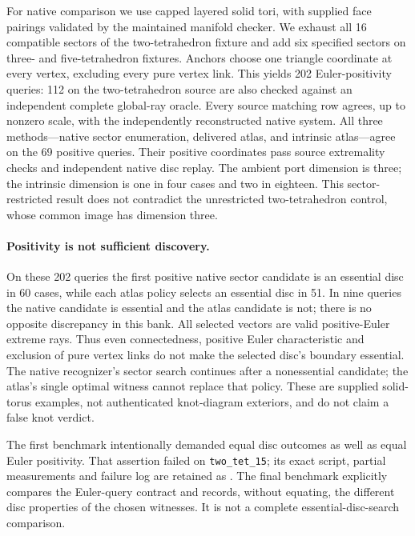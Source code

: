 For native comparison we use capped layered solid tori, with supplied
face pairings validated by the maintained manifold checker.  We exhaust
all 16 compatible sectors of the two-tetrahedron fixture and add six
specified sectors on three- and five-tetrahedron fixtures.  Anchors
choose one triangle coordinate at every vertex, excluding every pure
vertex link.  This yields 202 Euler-positivity queries: 112 on the
two-tetrahedron source are also checked against an independent complete
global-ray oracle.  Every source matching row agrees, up to nonzero
scale, with the independently reconstructed native system.  All three
methods---native sector enumeration, delivered atlas, and intrinsic
atlas---agree on the 69 positive queries.  Their positive coordinates
pass source extremality checks and independent native disc replay.
The ambient port dimension is three; the intrinsic dimension is one
in four cases and two in eighteen.  This sector-restricted result does
not contradict the unrestricted two-tetrahedron control, whose common
image has dimension three.

\paragraph{Positivity is not sufficient discovery.}
On these 202 queries the first positive native sector candidate is an
essential disc in 60 cases, while each atlas policy selects an essential
disc in 51.  In nine queries the native candidate is essential and the
atlas candidate is not; there is no opposite discrepancy in this bank.
All selected vectors are valid positive-Euler extreme rays.  Thus even
connectedness, positive Euler characteristic and exclusion of pure
vertex links do not make the selected disc's boundary essential.
The native recognizer's sector search continues after a nonessential
candidate; the atlas's single optimal witness cannot replace that
policy.  These are supplied solid-torus examples, not authenticated
knot-diagram exteriors, and do not claim a false knot verdict.

The first benchmark intentionally demanded equal disc outcomes as well
as equal Euler positivity.  That assertion failed on
\texttt{two\_tet\_15}; its exact script, partial measurements and failure
log are retained as .
The final benchmark explicitly compares the Euler-query contract and
records, without equating, the different disc properties of the chosen
witnesses.  It is not a complete essential-disc-search comparison.


